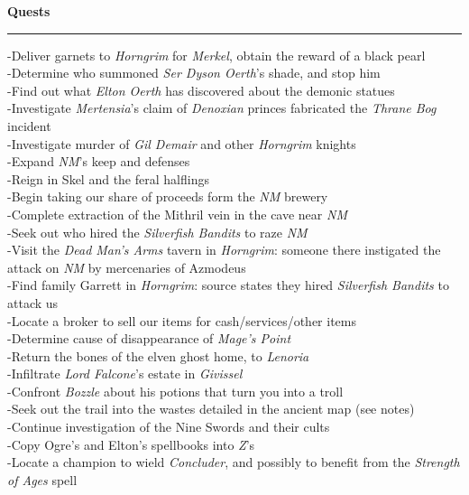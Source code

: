 \documentclass[letterpaper]{article}
\newcommand{\e}[1]{\emph{#1}}
\newcommand{\B}[1]{\textbf{#1}}
\newenvironment{notesection}[1]
{ {\huge \B{#1}}\hrule\vspace{0.5em}\begingroup\fontsize{9pt}{12pt}\selectfont}
{\endgroup}
\begin{document}
\begin{notesection}{Quests}
-Deliver garnets to \e{Horngrim} for \e{Merkel}, obtain the reward of a black pearl\\
-Determine who summoned \e{Ser Dyson Oerth}'s shade, and stop him\\
-Find out what \e{Elton Oerth} has discovered about the demonic statues\\
-Investigate \e{Mertensia}'s claim of \e{Denoxian} princes fabricated the \e{Thrane Bog} incident\\
-Investigate murder of \e{Gil Demair} and other \e{Horngrim} knights\\

-Expand \e{NM}'s keep and defenses\\
-Reign in Skel and the feral halflings\\
-Begin taking our share of proceeds form the \e{NM} brewery\\
-Complete extraction of the Mithril vein in the cave near \e{NM}\\
-Seek out who hired the \e{Silverfish Bandits} to raze \e{NM}\\
-Visit the \e{Dead Man's Arms} tavern in \e{Horngrim}: someone there instigated the attack on \e{NM} by mercenaries of Azmodeus\\
-Find family Garrett in \e{Horngrim}: source states they hired \e{Silverfish Bandits} to attack us\\
-Locate a broker to sell our items for cash/services/other items\\

-Determine cause of disappearance of \e{Mage's Point}\\
-Return the bones of the elven ghost home, to \e{Lenoria}\\
-Infiltrate \e{Lord Falcone}'s estate in \e{Givissel}\\

-Confront \e{Bozzle} about his potions that turn you into a troll\\
-Seek out the trail into the wastes detailed in the ancient map (see notes)\\
-Continue investigation of the Nine Swords and their cults\\

-Copy Ogre's and Elton's spellbooks into \e{Z}'s\\
-Locate a champion to wield \e{Concluder}, and possibly to benefit from the \e{Strength of Ages} spell\\
\end{notesection}
\end{document}
